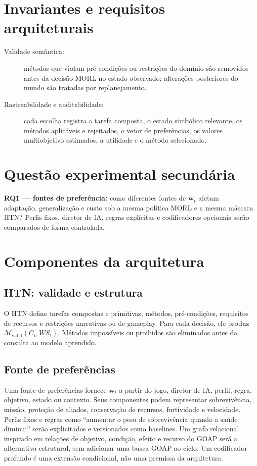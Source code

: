 \section{Invariantes e requisitos arquiteturais}

\begin{description}
\item[Validade semântica:] métodos que violam pré-condições ou restrições do
domínio são removidos antes da decisão MORL no estado observado; alterações
posteriores do mundo são tratadas por replanejamento.
\item[Rastreabilidade e auditabilidade:] cada escolha registra a tarefa
composta, o estado simbólico relevante, os métodos aplicáveis e rejeitados, o
vetor de preferências, os valores multiobjetivo estimados, a utilidade e o
método selecionado.
\end{description}

\section{Questão experimental secundária}

\textbf{RQ1 --- fontes de preferência:} como diferentes fontes de
$\mathbf{w}_t$ afetam adaptação, generalização e custo sob a mesma política
MORL e a mesma máscara HTN? Perfis fixos, diretor de IA, regras explícitas e
codificadores opcionais serão comparados de forma controlada.

\section{Componentes da arquitetura}

\subsection{HTN: validade e estrutura}

O HTN define tarefas compostas e primitivas, métodos, pré-condições, requisitos
de recursos e restrições narrativas ou de gameplay.
Para cada decisão, ele produz $\mathcal{M}_{\mathrm{valid}}(C_t,WS_t)$.
Métodos impossíveis ou proibidos são eliminados antes da consulta ao modelo aprendido.

\subsection{Fonte de preferências}

Uma fonte de preferências fornece $\mathbf{w}_t$ a partir do jogo, diretor de
IA, perfil, regra, objetivo, estado ou contexto.
Seus componentes podem representar sobrevivência, missão, proteção de aliados,
conservação de recursos, furtividade e velocidade.
Perfis fixos e regras como ``aumentar o peso de sobrevivência quando a saúde diminui''
serão explicitados e versionados como baselines.
Um grafo relacional inspirado em relações de objetivo, condição, efeito e recurso
do GOAP será a alternativa estrutural, sem adicionar uma busca GOAP ao ciclo.
Um codificador profundo é uma extensão condicional, não uma premissa da arquitetura.

